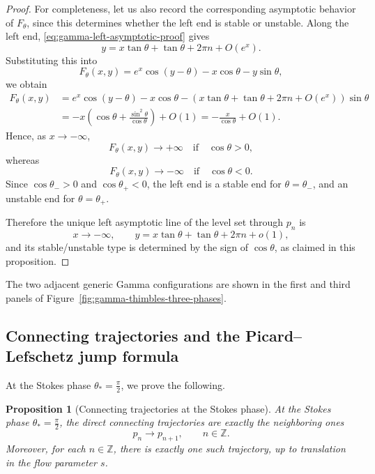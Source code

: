 \documentclass[11pt]{amsart}
\theoremstyle{plain}
\newtheorem{prop}[thm]{Proposition}
\newcommand{\Z}{\mathbb Z}
\begin{document}
\begin{proof}
For completeness, let us also record the corresponding asymptotic behavior of
\(F_\theta\), since this determines whether the left end is stable or unstable.
Along the left end, \eqref{eq:gamma-left-asymptotic-proof} gives
\[
y
=
x\tan\theta
+
\tan\theta
+
2\pi n
+
O(e^x).
\]
Substituting this into
\[
F_\theta(x,y)
=
e^x\cos(y-\theta)
-
x\cos\theta
-
y\sin\theta,
\]
we obtain
\[
\begin{aligned}
F_\theta(x,y)
&=
e^x\cos(y-\theta)
-
x\cos\theta
-
\left(
x\tan\theta+\tan\theta+2\pi n+O(e^x)
\right)\sin\theta  \\
&=
-
x\left(
\cos\theta+\frac{\sin^2\theta}{\cos\theta}
\right)
+O(1)=
-\frac{x}{\cos\theta}+O(1).
\end{aligned}
\]
Hence, as \(x\to-\infty\),
\[
F_\theta(x,y)\to+\infty
\quad\text{if}\quad
\cos\theta>0,
\]
whereas
\[
F_\theta(x,y)\to-\infty
\quad\text{if}\quad
\cos\theta<0.
\]
Since \(\cos\theta_->0\) and \(\cos\theta_+<0\), the left end is a stable end
for \(\theta=\theta_-\), and an unstable end for \(\theta=\theta_+\).

Therefore the unique left asymptotic line of the level set through \(p_n\) is
\[
x\to-\infty,
\qquad
y
=
x\tan\theta
+
\tan\theta
+
2\pi n
+
o(1),
\]
and its stable/unstable type is determined by the sign of \(\cos\theta\), as
claimed in this proposition.
\end{proof}

The two adjacent generic Gamma configurations are shown in the first and third panels of Figure~\ref{fig:gamma-thimbles-three-phases}.

\smallskip
\subsection{Connecting trajectories and the Picard--Lefschetz jump formula}

At the Stokes phase \(\theta_*=\frac{\pi}{2}\), we prove the following.

\begin{prop}[Connecting trajectories at the Stokes phase]\label{prop:gamma-neighboring-trajectories}
At the Stokes phase \(\theta_*=\frac{\pi}{2}\), the direct connecting trajectories are exactly the neighboring ones
\[
p_n\longrightarrow p_{n+1},
\qquad n\in\Z.
\]
Moreover, for each \(n\in\Z\), there is exactly one such trajectory, up to translation in the flow parameter \(s\).
\end{prop}
\end{document}
